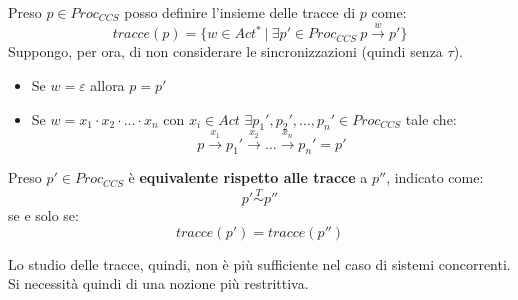 Preso $p \in Proc_{CCS}$ posso definire l'insieme delle tracce di $p$ come:
\begin{equation}
    tracce(p) = \{w \in Act^{\ast}\ |\ \exists p' \in Proc_{CCS} \ p \xrightarrow{w} p'\}
\end{equation}
Suppongo, per ora, di non considerare le sincronizzazioni (quindi senza $\tau$).
\begin{itemize}
    \item Se $w = \varepsilon$ allora $p =  p'$
    \item Se $w = x_1 \cdot x_2 \cdot \dots \cdot x_n$ con $x_i \in Act$ $\exists p_1', p_2', \dots, p_n' \in Proc_{CCS}$ tale che: $$p \xrightarrow{x_1} p_1' \xrightarrow{x_2} \dots \xrightarrow{x_n} p_n' = p'$$
\end{itemize}
\begin{teorema}
    Preso $p' \in Proc_{CCS}$ è \textbf{equivalente rispetto alle tracce} a $p''$, indicato come: $$p' \stackrel{T}{\sim}  p''$$ se e solo se:
    \begin{equation}
        tracce(p') = tracce(p'')
    \end{equation}
\end{teorema}
Lo studio delle tracce, quindi, non è più sufficiente nel caso di sistemi concorrenti. Si necessità quindi di una nozione più restrittiva.
